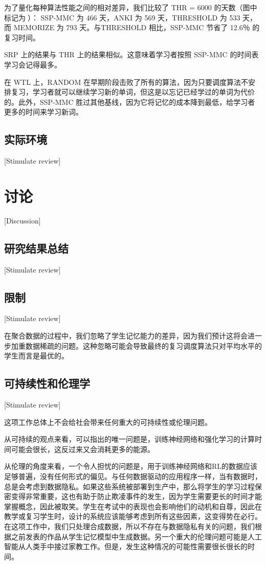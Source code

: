 为了量化每种算法性能之间的相对差异，我们比较了 THR  = 6000 的天数（图中标记为🌟）： SSP-MMC 为 466 天，ANKI 为 569 天，THRESHOLD 为 533 天，而 MEMORIZE 为 793 天。与THRESHOLD 相比，SSP-MMC 节省了 12.6％ 的复习时间。

SRP 上的结果与 THR 上的结果相似。这意味着学习者按照 SSP-MMC 的时间表学习会记得最多。

在 WTL 上，RANDOM 在早期阶段击败了所有的算法，因为只要调度算法不安排复习，学习者就可以继续学习新的单词，但这是以忘记已经学过的单词为代价的。此外，SSP-MMC 胜过其他基线，因为它将记忆的成本降到最低，给学习者更多的时间来学习新词。

\section{实际环境}[Stimulate review]


\chapter[讨论]{讨论}[Discussion]

\section{研究结果总结}[Stimulate review]

\section{限制}[Stimulate review]

在聚合数据的过程中，我们忽略了学生记忆能力的差异，因为我们预计这将会进一步加重数据稀疏的问题。这种忽略可能会导致最终的复习调度算法只对平均水平的学生而言是最优的。

\section{可持续性和伦理学}[Stimulate review]

这项工作总体上不会给社会带来任何重大的可持续性或伦理问题。

从可持续的观点来看，可以指出的唯一问题是，训练神经网络和强化学习的计算时间可能会很长，这反过来又会消耗更多的能源。

从伦理的角度来看，一个令人担忧的问题是，用于训练神经网络和RL的数据应该足够普遍，没有任何形式的偏见。与任何数据驱动的应用程序一样，当有数据时，总是会考虑到数据隐私。如果这些系统被部署到生产中，那么将学生的学习过程保密变得非常重要，这也有助于防止欺凌事件的发生，因为学生需要更长的时间才能掌握概念，因此被取笑。学生在考试中的表现也会影响他们的动机和自尊，因此在教学或复习学生时，设计的系统应该能够考虑到所有这些因素，这变得势在必行。在这项工作中，我们只处理合成数据，所以不存在与数据隐私有关的问题，我们根据之前发表的作品从学生记忆模型中生成数据。另一个重大的伦理问题可能是人工智能从人类手中接过家教工作。但是，发生这种情况的可能性需要很长很长的时间。

